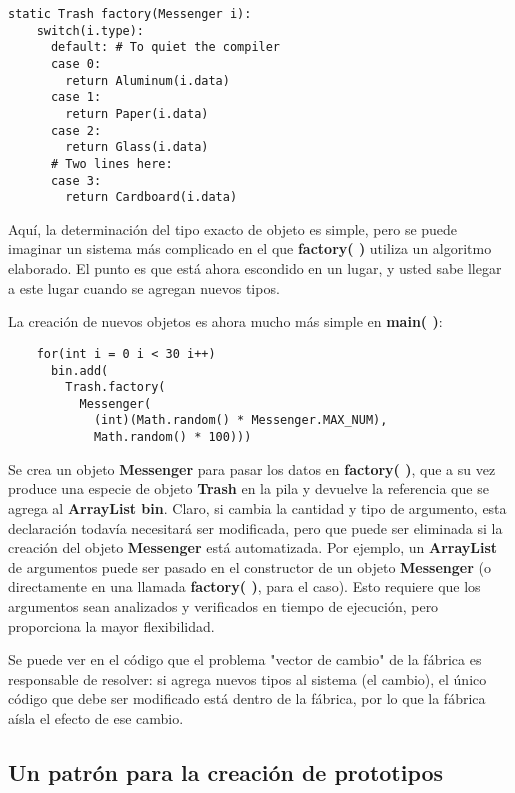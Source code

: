 \begin{lstlisting}
static Trash factory(Messenger i): 
    switch(i.type): 
      default: # To quiet the compiler 
      case 0: 
        return Aluminum(i.data) 
      case 1: 
        return Paper(i.data) 
      case 2: 
        return Glass(i.data) 
      # Two lines here: 
      case 3:  
        return Cardboard(i.data)
\end{lstlisting}

Aquí, la determinación del tipo exacto de objeto es simple, pero se puede imaginar un sistema más complicado en el que \textbf{factory( )} utiliza un algoritmo elaborado. El punto es que está ahora escondido en un lugar, y usted sabe llegar a este lugar cuando se agregan nuevos tipos.  \newline

La creación de nuevos objetos es ahora mucho más simple en \textbf{main( )}:    \newline

\begin{lstlisting} 
    for(int i = 0 i < 30 i++) 
      bin.add( 
        Trash.factory( 
          Messenger( 
            (int)(Math.random() * Messenger.MAX_NUM), 
            Math.random() * 100))) 
\end{lstlisting}

Se crea un objeto \textbf{Messenger} para pasar los datos en \textbf{factory( )},
que a su vez produce una especie de objeto \textbf{Trash} en la pila y devuelve la referencia que se agrega al \textbf{ArrayList bin}. Claro, si cambia la cantidad y tipo de argumento, esta declaración todavía necesitará ser modificada, pero que puede ser eliminada si la creación del objeto \textbf{Messenger} está automatizada. Por ejemplo, un \textbf{ArrayList} de argumentos puede ser pasado en el constructor de un objeto \textbf{Messenger} (o directamente en una llamada \textbf{factory( )}, para el caso). Esto requiere que los argumentos sean analizados y verificados en tiempo de ejecución, pero proporciona la mayor flexibilidad.    \newline

Se puede ver en el código que el problema "vector de cambio" de la fábrica es responsable de resolver: si agrega nuevos tipos al sistema (el cambio), el único código que debe ser modificado está dentro de la fábrica, por lo que la fábrica aísla el efecto de ese cambio. \newline

\subsection*{Un patrón para la creación de prototipos}
\label{subsec:upplcdp}

